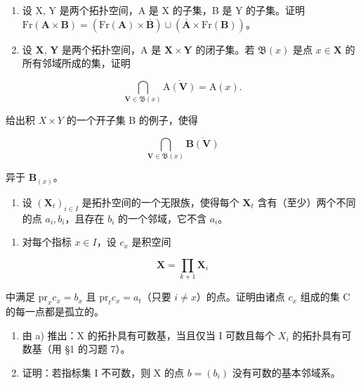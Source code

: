 \BourbakiExerciseGroup

\begin{enumerate}
\def\labelenumi{\arabic{enumi})}
\item
  设 X, Y 是两个拓扑空间，A 是 X 的子集，B 是 Y 的子集。证明 \(\mathrm{Fr}(\mathbf{A} \times \mathbf{B}) = (\mathrm{Fr}(\mathbf{A}) \times \overline{\mathbf{B}}) \cup (\overline{\mathbf{A}} \times \mathrm{Fr}(\mathbf{B}))\)。
\item
  设 \(\mathbf{X}\), \(\mathbf{Y}\) 是两个拓扑空间，A 是 \(\mathbf{X} \times \mathbf{Y}\) 的闭子集。若 \(\mathfrak{B}(x)\) 是点 \(x \in \mathbf{X}\) 的所有邻域所成的集，证明
\end{enumerate}

\[
\bigcap_ {\mathbf {V} \in \mathfrak {B} (x)} \overline {{\mathrm{A} (\mathbf {V})}} = \mathrm{A} (x).
\]

给出积 \(X \times Y\) 的一个开子集 B 的例子，使得

\[
\bigcap_ {\mathbf {V} \in \mathfrak {B} (x)} \overline {{\mathbf {B} (\mathbf {V})}}
\]

异于 \(\mathbf{B}_{(x)}\)。

\begin{enumerate}
\def\labelenumi{\arabic{enumi})}
\setcounter{enumi}{2}
\tightlist
\item
  设 \((\mathbf{X}_t)_{i\in I}\) 是拓扑空间的一个无限族，使得每个 \(\mathbf{X}_t\) 含有（至少）两个不同的点 \(a_i, b_i\)，且存在 \(b_i\) 的一个邻域，它不含 \(a_i\)。
\end{enumerate}

\begin{enumerate}
\def\labelenumi{\alph{enumi})}
\tightlist
\item
  对每个指标 \(x \in I\)，设 \(c_{x}\) 是积空间
\end{enumerate}

\[
\mathbf {X} = \prod_ {k + 1} \mathbf {X} _ {i}
\]

中满足 \(\mathrm{pr}_x c_x = b_x\) 且 \(\mathrm{pr}_t c_x = a_t\)（只要 \(i \neq x\)）的点。证明由诸点 \(c_x\) 组成的集 C 的每一点都是孤立的。

\begin{enumerate}
\def\labelenumi{\alph{enumi})}
\setcounter{enumi}{1}
\item
  由 a) 推出：X 的拓扑具有可数基，当且仅当 I 可数且每个 \(X_{i}\) 的拓扑具有可数基（用 §1 的习题 7）。
\item
  证明：若指标集 I 不可数，则 X 的点 \(b = (b_{i})\) 没有可数的基本邻域系。
\end{enumerate}

